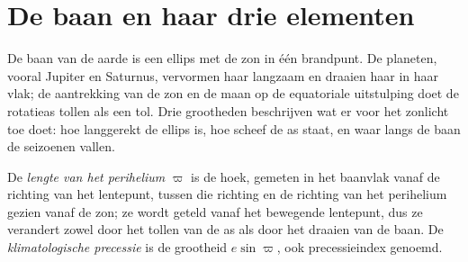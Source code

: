 \section{De baan en haar drie elementen}\label{sec:b2:orbital-forcing:elements}

De baan van de aarde is een ellips met de zon in één brandpunt. De planeten, vooral Jupiter en Saturnus,
vervormen haar langzaam en draaien haar in haar vlak; de aantrekking van de zon en de maan op de equatoriale
uitstulping doet de rotatieas tollen als een tol. Drie grootheden beschrijven wat er voor het
zonlicht toe doet: hoe langgerekt de ellips is, hoe scheef de as staat, en waar langs de baan de
seizoenen vallen.

\begin{definition}\label{def:b2:orbital-forcing:elements}
De \emph{lengte van het perihelium} $\varpi$ is de hoek, gemeten in
het baanvlak vanaf de richting van het lentepunt, tussen die richting en de
richting van het perihelium gezien vanaf de zon; ze wordt geteld vanaf het bewegende lentepunt, dus ze
verandert zowel door het tollen van de as als door het draaien van de baan. De \emph{klimatologische
precessie} is de grootheid $e\sin\varpi$, ook
precessieindex genoemd.
\end{definition}

